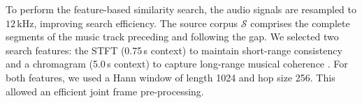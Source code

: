 \documentclass{article}
\begin{document}


To perform the feature-based similarity search, the audio signals are resampled to $12$\,kHz, improving search efficiency. %
The source corpus $\mathcal{S}$ comprises the complete segments of the music track preceding and following the gap. 
We selected two search features: the STFT (0.75\,s context) to maintain short-range consistency and a chromagram (5.0\,s context) to capture long-range musical coherence \cite{muller_music_2021}.
For both features, we used a Hann window of length 1024 and hop size 256.
This allowed an efficient joint frame pre-processing.
\end{document}
